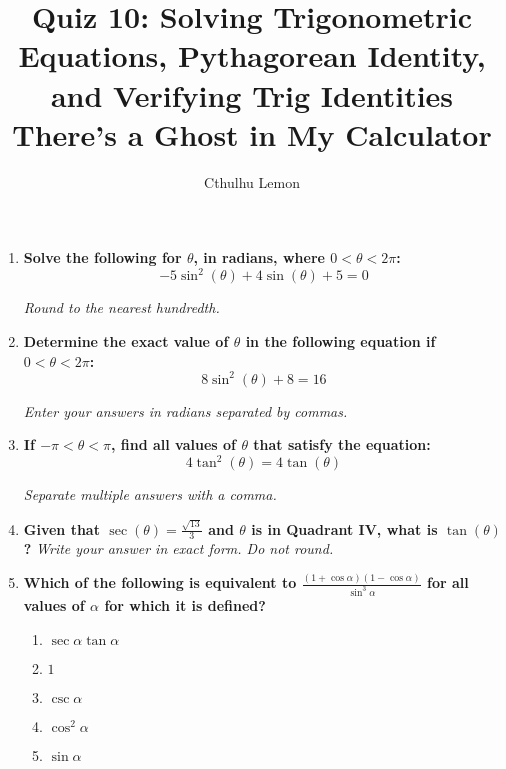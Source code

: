 \documentclass[12pt]{article}
\title{
    \vspace{2in}
    \textbf{Quiz 10: Solving Trigonometric Equations, Pythagorean Identity, and Verifying Trig Identities}\\
    \vspace{0.1in}
    \large There's a Ghost in My Calculator\\
    \vspace{3in}
}
\author{Cthulhu Lemon}
\date{}
\begin{document}
\maketitle
\newpage

\begin{enumerate}
    \item \textbf{Solve the following for \( \theta \), in radians, where \( 0 < \theta < 2\pi \):}
    \[ -5\sin^2(\theta) + 4\sin(\theta) + 5 = 0 \]
    
    \textit{Round to the nearest hundredth.}
    \vspace{45mm}

    
    \item \textbf{Determine the exact value of \( \theta \) in the following equation if \( 0 < \theta < 2\pi \):}
    \[ 8\sin^2(\theta) + 8 = 16 \]
    
    \textit{Enter your answers in radians separated by commas.}
    \vspace{45mm}

    
    \item \textbf{If \( -\pi < \theta < \pi \), find all values of \( \theta \) that satisfy the equation:}
    \[ 4\tan^2(\theta) = 4\tan(\theta) \]
    
    \textit{Separate multiple answers with a comma.}
    \vspace{45mm}

    \newpage
    \item \textbf{Given that \( \sec(\theta) = \frac{\sqrt{13}}{3} \) and \( \theta \) is in Quadrant IV, what is \( \tan(\theta) \)?}
    \textit{Write your answer in exact form. Do not round.}
    \vspace{45mm}

    \item \textbf{Which of the following is equivalent to \( \frac{(1+\cos \alpha)(1-\cos \alpha)}{\sin^3 \alpha} \) for all values of \( \alpha \) for which it is defined?}
    \begin{enumerate}[label=$\square$] %
        \item \( \sec \alpha \tan \alpha \)
        \item \( 1 \)
        \item \( \csc \alpha \)
        \item \( \cos^2 \alpha \)
        \item \( \sin \alpha \)
    \end{enumerate}
    

\end{enumerate}
\end{document}
